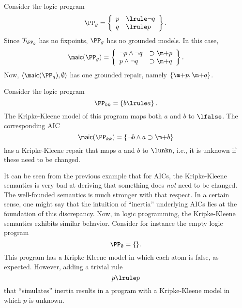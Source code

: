  
\begin{example}\label{ex:grounded}
  Consider the logic program 
  \[\PP_g = \left\{\begin{array}{ll}p&\lrule \lnot q\\ q&\lrule p \end{array} \right\}.\]
  Since $\mathcal{T}_{\PP_g}$ has no fixpoints, $\PP_g$ has no grounded models. 
  In this case, 
  \[\aicop(\PP_g) = \left\{\begin{array}{ll}\lnot p\land \lnot q &\aicrule \add p \\ p \land  \lnot q &\aicrule \add q\end{array}\right\}.\]
  Now, $\langle \aicop(\PP_g),\emptyset\rangle$ has one grounded repair, namely $\{\add p, \add q\}$. 
\end{example}




\begin{example}
 Consider the logic program
 \[\PP_{kk}=\left\{ b\lrule a\right\}.\]
 The Kripke-Kleene model of this program maps both $a$ and $b$ to $\lfalse$. 
 The corresponding AIC 
 \[\aicop(\PP_{kk}) = \{\lnot b \land a \aicrule \add b\}\] 
 has a Kripke-Kleene repair that maps $a$ and $b$ to $\lunkn$, i.e., it is unknown if these need to be changed. 
\end{example}


It can be seen from the previous example that for AICs, the Kripke-Kleene semantics is very bad at deriving that something does \emph{not} need to be changed. The well-founded semantics is much stronger with that respect. 
In a certain sense, one might say that the intuition of ``inertia'' underlying AICs lies at the foundation of this discrepancy. 
Now, in logic programming, the Kripke-Kleene semantics exhibits similar behavior. Consider for instance the empty logic program 
\[ \PP_\emptyset = \{ \}.\]
This program has a Kripke-Kleene model in which each atom is false, as expected. 
However, adding a trivial rule
\[p\lrule p\]
 that ``simulates'' inertia results in a program with a Kripke-Kleene model in which $p$ is unknown.
 
